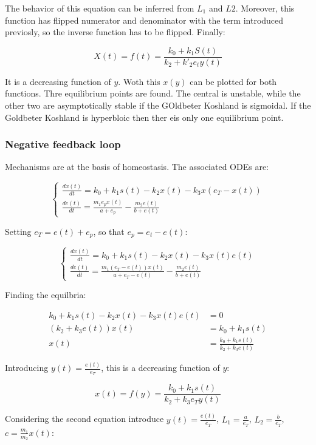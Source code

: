     The behavior of this equation can be inferred from $L_1$ and $L2$.
    Moreover, this function has flipped numerator and denominator with the term introduced previosly, so the inverse function has to be flipped.
    Finally:

    $$X(t) = f(t) = \frac{k_0 + k_1S(t)}{k_2+k'_2e_ty(t)}$$

    It is a decreasing function of $y$.
    Woth this $x(y)$ can be plotted for both functions.
    Thre equilibrium points are found.
    The central is unstable, while the other two are asymptotically stable if the GOldbeter Koshland is sigmoidal.
    If the Goldbeter Koshland is hyperbloic then ther eis only one equilibrium point.

    \subsubsection{Negative feedback loop}
    Mechanisms are at the basis of homeostasis.
    The associated ODEs are:

    $$\begin{cases}
      \frac{dx(t)}{dt} = k_0 + k_1s(t) - k_2x(t) - k_3x(e_T-x(t))\\
      \frac{de(t)}{dt} = \frac{m_1e_px(t)}{a + e_p} - \frac{m_2e(t)}{b+e(t)}
    \end{cases}$$

    Setting $e_T = e(t) + e_p$, so that $e_p = e_t-e(t)$:

    $$\begin{cases}
      \frac{dx(t)}{dt} = k_0 + k_1s(t) - k_2x(t) - k_3x(t)e(t)\\
      \frac{de(t)}{dt} = \frac{m_1(e_T-e(t))x(t)}{a + e_T-e(t)} - \frac{m_2e(t)}{b+e(t)}
    \end{cases}$$

    Finding the equilbria:

    \begin{align*}
      k_0 + k_1s(t) - k_2x(t) - k_3x(t)e(t) &= 0\\
      (k_2+k_3e(t))x(t) &= k_0 + k_1s(t)\\
      x(t) &= \frac{k_0 + k_1s(t)}{k_2 + k_3e(t)}
    \end{align*}

    Introducing $y(t) = \frac{e(t)}{e_T}$, this is a decreasing function of $y$:

    $$x(t) = f(y) = \frac{k_0 + k_1s(t)}{k_2 + k_3e_Ty(t)}$$

    Considering the second equation introduce $y(t) = \frac{e(t)}{e_T}$, $L_1 = \frac{a}{e_T}$, $L_2 = \frac{b}{e_T}$, $c = \frac{m_1}{m_2}x(t)$:

